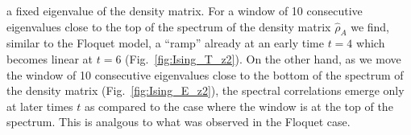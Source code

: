 \documentclass[aps,prb,preprint,onecolumn,amsmath,amssymb,superscriptaddress,eqsecnum,floatfix,scrartcl]{revtex4-1}
\begin{document}
a fixed eigenvalue of the density matrix.
For a window of 10 consecutive
eigenvalues 
close to the top of the spectrum
of the density matrix ${\hat \rho}_A$
we find,
similar to the  Floquet model,   a  ``ramp''
 already at an 
early  time $t=4$ which becomes linear at $t=6$ (Fig.~\ref{fig:Ising_T_z2}). 
On the other hand, as we move the window of 10 consecutive eigenvalues
close  to the 
bottom of the 
spectrum
 of the density matrix
 (Fig.~\ref{fig:Ising_E_z2}),
the spectral
correlations 
emerge only  
at 
later times  $t$  as compared to the case where the window is 
at the top  of the spectrum.
This is analgous to what was observed in the Floquet case.



\end{document}
